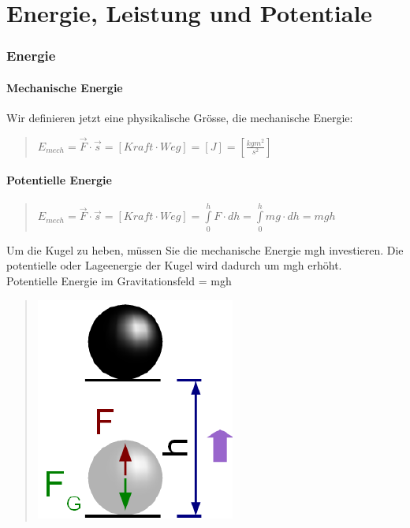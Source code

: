 
\part*{Energie, Leistung und Potentiale}


\section*{Energie}


\subsection*{Mechanische Energie}

Wir definieren jetzt eine physikalische Grösse, die mechanische Energie:
\begin{verse}
$E_{mech}=\vec{F}\cdot\vec{s}=\left[Kraft\cdot Weg\right]=\left[J\right]=\left[\frac{kgm^{2}}{s^{2}}\right]$
\end{verse}

\subsection*{Potentielle Energie}
\begin{verse}
$E_{mech}=\vec{F}\cdot\vec{s}=\left[Kraft\cdot Weg\right]=\overset{h}{\underset{0}{\int}}F\cdot dh=\overset{h}{\underset{0}{\int}}mg\cdot dh=mgh$
\end{verse}
Um die Kugel zu heben, müssen Sie die mechanische Energie mgh investieren.
Die potentielle oder Lageenergie der Kugel wird dadurch um mgh erhöht.\\
Potentielle Energie im Gravitationsfeld = mgh
\begin{verse}
\includegraphics[scale=0.6]{Energie-Leistung-Potentiale/Potentielle_Energie}
\end{verse}


